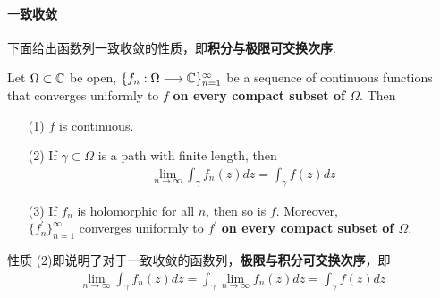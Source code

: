 \paragraph{一致收敛}
	下面给出函数列一致收敛的性质，即\textbf{积分与极限可交换次序}.
	\begin{thm}\label{thm 5.4.1}
		Let $\Omega \subset \mathbb{C}$ be open, $\{ f_n : \Omega \longrightarrow \mathbb{C} \}_{n = 1}^{\infty}$ be a sequence of continuous functions that converges uniformly to $f$ \textbf{on every compact subset of $\Omega$}. Then
		\begin{enumerate}
			\item[(1)]$f$ is continuous.
			
			\vspace{1em}
			
			\item[(2)]If $\gamma \subset \Omega$ is a path with finite length, then
			\begin{align}
				\lim_{n \to \infty}{\int_{\gamma}{f_{n}(z) dz}} = \int_{\gamma}{f(z) dz}
			\end{align}
		
			\vspace{1em}
			
			\item[(3)]If $f_n$ is holomorphic for all $n$, then so is $f$. Moreover, \\
			$\{ f_{n}^{'} \}_{n = 1}^{\infty}$ converges uniformly to $f^{'}$ \textbf{on every compact subset of $\Omega$}.
		\end{enumerate}
		
		\vspace{1em}
		\begin{rmk}
			性质 (2)即说明了对于一致收敛的函数列，\textbf{极限与积分可交换次序}，即
			\begin{align}
				\lim_{n \to \infty}{\int_{\gamma}{f_{n}(z) dz}} = \int_{\gamma}{\lim_{n \to \infty}{f_{n}(z) dz}} = \int_{\gamma}{f(z) dz}
			\end{align}
		\end{rmk}
	

\end{thm}
